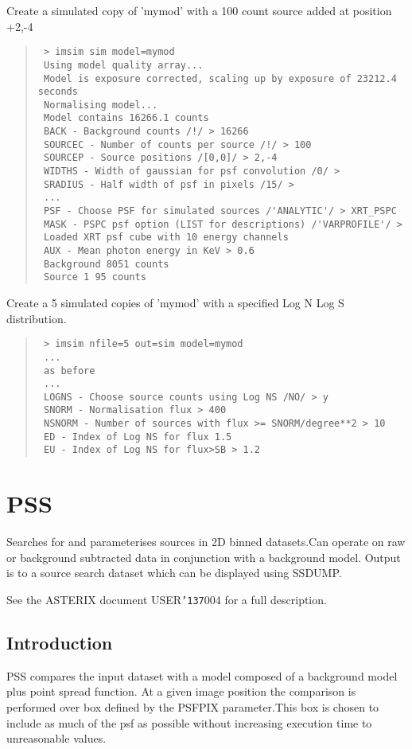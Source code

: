 \documentclass{book}
\renewcommand{\_}{{\tt\char'137}}     %
\begin{document}
Create a simulated copy of 'mymod' with a 100 count source added at
position +2,-4
\begin{quote}\begin{verbatim}
 > imsim sim model=mymod
 Using model quality array...
 Model is exposure corrected, scaling up by exposure of 23212.4 seconds
 Normalising model...
 Model contains 16266.1 counts
 BACK - Background counts /!/ > 16266
 SOURCEC - Number of counts per source /!/ > 100
 SOURCEP - Source positions /[0,0]/ > 2,-4
 WIDTHS - Width of gaussian for psf convolution /0/ >
 SRADIUS - Half width of psf in pixels /15/ >
 ...
 PSF - Choose PSF for simulated sources /'ANALYTIC'/ > XRT_PSPC
 MASK - PSPC psf option (LIST for descriptions) /'VARPROFILE'/ >
 Loaded XRT psf cube with 10 energy channels
 AUX - Mean photon energy in KeV > 0.6
 Background 8051 counts
 Source 1 95 counts
\end{verbatim}\end{quote}
Create a 5 simulated copies of 'mymod' with a specified Log N Log S
distribution.
\begin{quote}\begin{verbatim}
 > imsim nfile=5 out=sim model=mymod
 ...
 as before
 ...
 LOGNS - Choose source counts using Log NS /NO/ > y
 SNORM - Normalisation flux > 400
 NSNORM - Number of sources with flux >= SNORM/degree**2 > 10
 ED - Index of Log NS for flux 1.5
 EU - Index of Log NS for flux>SB > 1.2
\end{verbatim}\end{quote}
\section{PSS}
Searches for and parameterises sources in 2D binned datasets.Can
operate on raw or background subtracted data in conjunction with
a background model. Output is to a source search dataset which
can be displayed using SSDUMP.
 
See the ASTERIX document USER\_004 for a full description.
 
\subsection{Introduction}
PSS compares the input dataset with a model composed of a background
model plus point spread function. At a given image position the
comparison is performed over box defined by the PSFPIX parameter.This
box is chosen to include as much of the psf as possible without
increasing execution time to unreasonable values.
 
\end{document}

